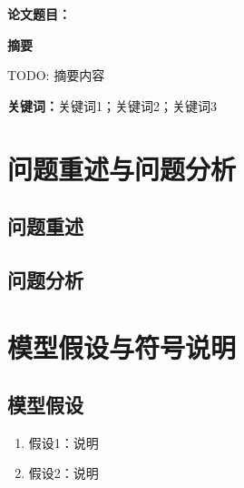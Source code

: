 



\begin{titlepage}
  \centering
  \vspace*{2cm}
  {\LARGE\bfseries 论文题目：\underline{\hspace{8cm}}\par}
  \vspace{2cm}

  {\large\bfseries 摘\quad 要\par}
  \vspace{0.5em}
  TODO: 摘要内容

  \vspace{1em}
  \noindent\textbf{关键词：}关键词1；关键词2；关键词3

  \vfill
\end{titlepage}

\tableofcontents
\newpage

\section{问题重述与问题分析}

\subsection{问题重述}

\subsection{问题分析}

\section{模型假设与符号说明}

\subsection{模型假设}
\begin{enumerate}[label=\arabic*.]
  \item 假设1：说明
  \item 假设2：说明
\end{enumerate}

